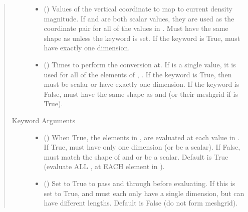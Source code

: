 \documentclass[letterpaper,10pt,english]{sphinxmanual}
\begin{document}
\begin{fulllineitems}
\begin{fulllineitems}
\begin{quote}
\begin{description}
\begin{itemize}
\item {} 
 () \textendash{} Values of the vertical coordinate to
map to current density magnitude. If  and  are both scalar
values, they are used as the coordinate pair for all of the
values in . Must have the same shape as  unless the
 keyword is set. If the  keyword is True,
 must have exactly one dimension.

\item {} 
 () \textendash{} Times to perform the conversion at.
If  is a single value, it is used for all of the elements of
, . If the  keyword is True, then  must be
scalar or have exactly one dimension. If the  keyword is
False,  must have the same shape as  and  (or their
meshgrid if  is True).

\end{itemize}

\item[{Keyword Arguments}] \leavevmode\begin{itemize}
\item {} 
 () \textendash{} When True, the elements in ,  are evaluated
at each value in . If True,  must have only one dimension
(or be a scalar). If False,  must match the shape of  and
 or be a scalar. Default is True (evaluate ALL ,  at
EACH element in ).

\item {} 
 () \textendash{} Set to True to pass  and  through
 before evaluating. If this is set to
True,  and  must each only have a single dimension, but
can have different lengths. Default is False (do not form
meshgrid).


\end{itemize}
\end{description}
\end{quote}
\end{fulllineitems}
\end{fulllineitems}
\end{document}
